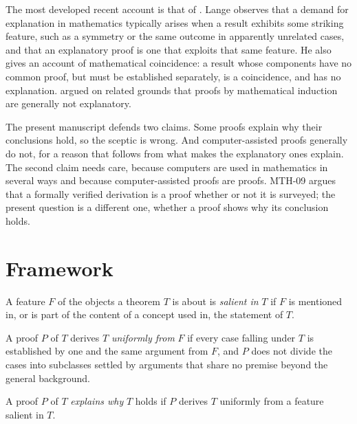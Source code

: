 \documentclass{situationist-preprint}
\begin{document}
The most developed recent account is that of \citet{Lange2014,Lange2017}. Lange observes that a demand for explanation in mathematics typically arises when a result exhibits some striking feature, such as a symmetry or the same outcome in apparently unrelated cases, and that an explanatory proof is one that exploits that same feature. He also gives an account of mathematical coincidence: a result whose components have no common proof, but must be established separately, is a coincidence, and has no explanation. \citet{Lange2009} argued on related grounds that proofs by mathematical induction are generally not explanatory.

The present manuscript defends two claims. Some proofs explain why their conclusions hold, so the sceptic is wrong. And computer-assisted proofs generally do not, for a reason that follows from what makes the explanatory ones explain. The second claim needs care, because computers are used in mathematics in several ways and because computer-assisted proofs are proofs. MTH-09 argues that a formally verified derivation is a proof whether or not it is surveyed; the present question is a different one, whether a proof shows why its conclusion holds.

\section{Framework}

\begin{definition}\label{d:salient}
A feature $F$ of the objects a theorem $T$ is about is \emph{salient in} $T$ if $F$ is mentioned in, or is part of the content of a concept used in, the statement of $T$.
\end{definition}

\begin{definition}\label{d:uniform}
A proof $P$ of $T$ derives $T$ \emph{uniformly from} $F$ if every case falling under $T$ is established by one and the same argument from $F$, and $P$ does not divide the cases into subclasses settled by arguments that share no premise beyond the general background.
\end{definition}

\begin{definition}\label{d:expl}
A proof $P$ of $T$ \emph{explains why} $T$ holds if $P$ derives $T$ uniformly from a feature salient in $T$.
\end{definition}
\end{document}
